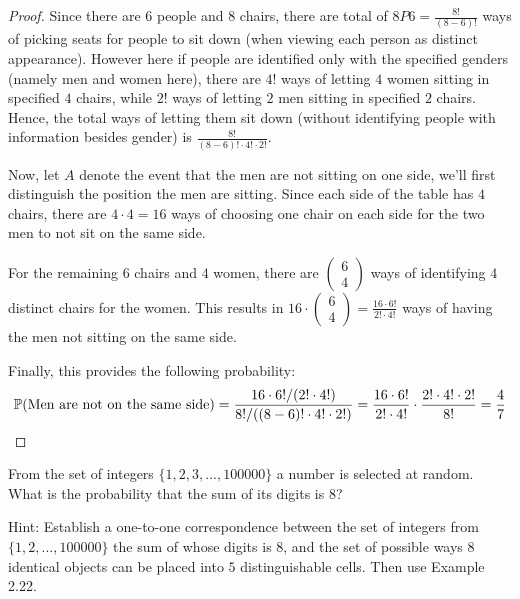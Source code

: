 \documentclass{article}
\begin{document}
\begin{proof}
    Since there are $6$ people and $8$ chairs, there are total of $8P6 = \frac{8!}{(8-6)!}$ ways of picking seats for people to sit down (when viewing each person as distinct appearance). However here if people are identified only with the specified genders (namely men and women here), there are $4!$ ways of letting $4$ women sitting in specified $4$ chairs, while $2!$ ways of letting $2$ men sitting in specified $2$ chairs. Hence, the total ways of letting them sit down (without identifying people with information besides gender) is $\frac{8!}{(8-6)!\cdot 4!\cdot 2!}$.

    \hfil

    Now, let $A$ denote the event that the men are not sitting on one side, we'll first distinguish the position the men are sitting. Since each side of the table has $4$ chairs, there are $4 \cdot 4=16$ ways of choosing one chair on each side for the two men to not sit on the same side.

    For the remaining $6$ chairs and $4$ women, there are $\begin{pmatrix}6\\4\end{pmatrix}$ ways of identifying $4$ distinct chairs for the women. This results in $16\cdot \begin{pmatrix}6\\4\end{pmatrix} = \frac{16\cdot 6!}{2!\cdot 4!}$ ways of having the men not sitting on the same side.

    \hfil

    Finally, this provides the following probability:
    \begin{align}
        \mathbb{P}(\textmd{Men are not on the same side}) = \frac{16\cdot 6!/(2!\cdot 4!)}{8!/((8-6)!\cdot 4!\cdot 2!)} = \frac{16\cdot 6!}{2!\cdot 4!}\cdot \frac{2!\cdot 4!\cdot 2!}{8!} = \frac{4}{7}
    \end{align}
\end{proof}

\newpage

\begin{ques}\label{q10}
    From the set of integers $\{1,2,3,...,100000\}$ a number is selected at random. What is the probability that the sum of its digits is $8$?
    
    Hint: Establish a one-to-one correspondence between the set of integers from $\{1,2,...,100000\}$ the sum of whose digits is $8$, and the set of possible ways $8$ identical objects can be placed into $5$ distinguishable cells. Then use Example 2.22.  
\end{ques}
\end{document}
